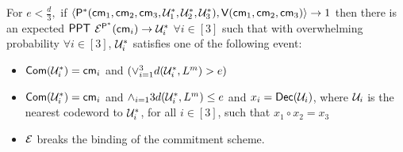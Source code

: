 \begin{theorem}
	For $ e < \frac{d}{3}, $ if $\langle \mathsf{P}^*(\mathsf{cm}_1, \mathsf{cm}_2, \mathsf{cm}_3 , \mathcal{U}^*_1	, \mathcal{U}^*_2, \mathcal{U}^*_3),\mathsf{V}(\mathsf{cm}_1, \mathsf{cm}_2, \mathsf{cm}_3)\rangle \rightarrow 1$ then there is an expected $\mathsf{PPT}$  $\mathcal{E}^{\mathsf{P}^*}(\mathsf{cm}_i)\rightarrow \mathcal{U}^*_i$ $\forall i\in [3]$ such that with overwhelming probability $\forall i \in [3]$, $\mathcal{U}^*_i$ satisfies one of the following event: 
	\begin{itemize}
		\item $\mathsf{Com}(\mathcal{U}^*_i) = \mathsf{cm}_i$ and $(\vee_{i=1}^{3} d(\mathcal{U}^*_i, L^m)> e)$ 
		\item $\mathsf{Com}(\mathcal{U}^*_i) = \mathsf{cm}_i$ and $\wedge_{i=1}{3} d(\mathcal{U}^*_i,L^m)\leq e$ and $ x_i = \mathsf{Dec}(\mathcal{U}_i)$, where $\mathcal{U}_i$ is the nearest codeword to $\mathcal{U}^*_i$, for all $i\in [3]$, such that $x_1 \circ x_2 = x_3$
		\item $\mathcal{E}$ breaks the binding of the commitment scheme.
	\end{itemize} 
	
\end{theorem}
